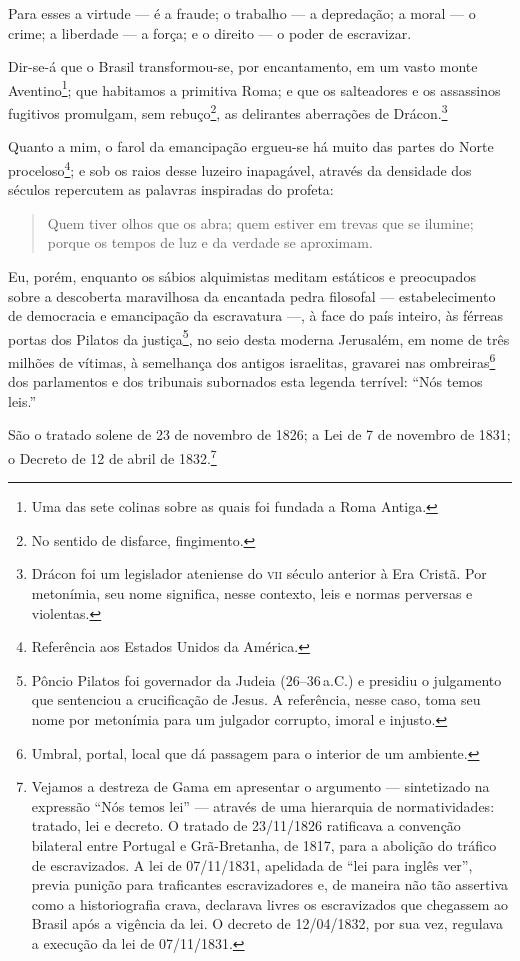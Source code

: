 Para esses a virtude --- é a fraude; o trabalho --- a depredação; a moral
--- o crime; a liberdade --- a força; e o direito --- o poder de
escravizar.

Dir-se-á que o Brasil transformou-se, por encantamento, em um vasto
monte Aventino\footnote{Uma das sete colinas sobre as quais foi
  fundada a Roma Antiga.}; que habitamos a primitiva Roma; e que os
salteadores e os assassinos fugitivos promulgam, sem rebuço\footnote{
  No sentido de disfarce, fingimento.}, as delirantes aberrações de
Drácon.\footnote{Drácon foi um legislador ateniense do \textsc{vii} século
  anterior à Era Cristã. Por metonímia, seu nome significa, nesse
  contexto, leis e normas perversas e violentas.}

Quanto a mim, o farol da emancipação ergueu-se há muito das partes do
Norte proceloso\footnote{Referência aos Estados Unidos da América.}; e
sob os raios desse luzeiro inapagável, através da densidade dos séculos
repercutem as palavras inspiradas do profeta:

\begin{quote}
Quem tiver olhos que os abra; quem estiver em trevas que se ilumine;
porque os tempos de luz e da verdade se aproximam.
\end{quote}

Eu, porém, enquanto os sábios alquimistas meditam estáticos e
preocupados sobre a descoberta maravilhosa da encantada pedra filosofal
--- estabelecimento de democracia e emancipação da escravatura ---, à face
do país inteiro, às férreas portas dos Pilatos da justiça\footnote{
  Pôncio Pilatos foi governador da Judeia (26--36\,a.C.) e presidiu o
  julgamento que sentenciou a crucificação de Jesus. A referência, nesse
  caso, toma seu nome por metonímia para um julgador corrupto, imoral e
  injusto.}, no seio desta moderna Jerusalém, em nome de três milhões de
vítimas, à semelhança dos antigos israelitas, gravarei nas
ombreiras\footnote{Umbral, portal, local que dá passagem para o
  interior de um ambiente.} dos parlamentos e dos tribunais subornados
esta legenda terrível: ``Nós temos leis.''

São o tratado solene de 23 de novembro de 1826; a Lei de 7 de novembro
de 1831; o Decreto de 12 de abril de 1832.\footnote{Vejamos a destreza
  de Gama em apresentar o argumento --- sintetizado na expressão ``Nós
  temos lei'' --- através de uma hierarquia de normatividades: tratado,
  lei e decreto. O tratado de 23/11/1826 ratificava a convenção
  bilateral entre Portugal e Grã-Bretanha, de 1817, para a abolição do
  tráfico de escravizados. A lei de 07/11/1831, apelidada de ``lei para
  inglês ver'', previa punição para traficantes escravizadores e, de
  maneira não tão assertiva como a historiografia crava, declarava
  livres os escravizados que chegassem ao Brasil após a vigência da lei.
  O decreto de 12/04/1832, por sua vez, regulava a execução da lei de
  07/11/1831.}

